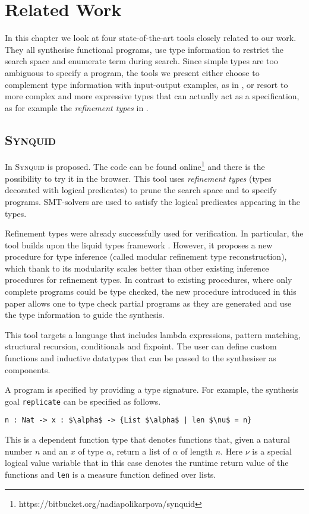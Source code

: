 \lstset{style=plain}

\chapter{Related Work} \label{ch:relatedwork}

In this chapter we look at four state-of-the-art tools closely related to our work. They all synthesise functional programs, use type information to restrict the search space and enumerate term during search. Since simple types are too ambiguous to specify a program, the tools we present either choose to complement type information with input-output examples, as in \cite{LambdaSquarePaper, EscherPaper, MythPaper}, or resort to more complex and more expressive types that can actually act as a specification, as for example the \emph{refinement types} in \cite{SynquidPaper}.

\section{\mdseries\textsc{Synquid}}

In \cite{SynquidPaper} \textsc{Synquid} is proposed. The code can be found online\footnote{https://bitbucket.org/nadiapolikarpova/synquid} and there is the possibility to try it in the browser.
This tool uses \emph{refinement types} (types decorated with logical predicates) to prune the search space and to specify programs. SMT-solvers are used to satisfy the logical predicates appearing in the types.

Refinement types were already successfully used for verification. In particular, the tool builds upon the liquid types framework \cite{LiquidTypes}. However, it proposes a new procedure for type inference (called modular refinement type reconstruction), which thank to its modularity scales better than other existing inference procedures for refinement types. In contrast to existing procedures, where only complete programs could be type checked, the new procedure introduced in this paper allows one to type check partial programs as they are generated and use the type information to guide the synthesis.

This tool targets a language that includes lambda expressions, pattern matching, structural recursion, conditionals and fixpoint.
The user can define custom functions and inductive datatypes that can be passed to the synthesiser as components.

A program is specified by providing a type signature. For example, the synthesis goal \lstinline!replicate! can be specified as follows.
\begin{lstlisting}[style=plain]
n : Nat -> x : $\alpha$ -> {List $\alpha$ | len $\nu$ = n}
\end{lstlisting}
This is a dependent function type that denotes functions that, given a natural number $n$ and an $x$ of type $\alpha$, return a list of $\alpha$ of length $n$. Here $\nu$ is a special logical value variable that in this case denotes the runtime return value of the functions and \lstinline!len! is a measure function defined over lists.

